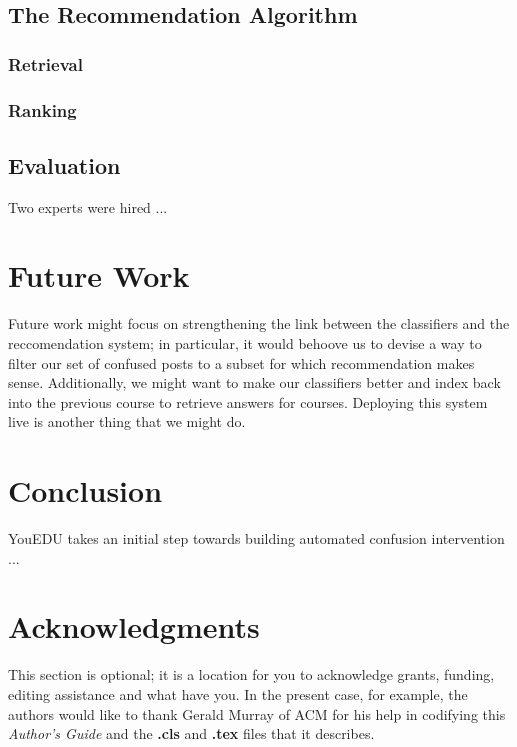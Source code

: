 \documentclass{edm_template}
\begin{document}
\subsection{The Recommendation Algorithm}
\subsubsection{Retrieval}
\subsubsection{Ranking}

\subsection{Evaluation}
Two experts were hired ...

\section{Future Work}
Future work might focus on strengthening the link between the classifiers and the reccomendation system; in particular, it would behoove us to devise a way to filter our set of confused posts to a subset for which recommendation makes sense. Additionally, we might want to make our classifiers better and index back into the previous course to retrieve answers for courses. Deploying this system live is another thing that we might do. 

\section{Conclusion}
YouEDU takes an initial step towards building automated confusion intervention ... 


\section{Acknowledgments}
This section is optional\cite{wen2014sentiment}; it is a location for you
to acknowledge grants, funding, editing assistance and
what have you.  In the present case, for example, the
authors would like to thank Gerald Murray of ACM for
his help in codifying this \textit{Author's Guide}
and the \textbf{.cls} and \textbf{.tex} files that it describes.

%

%
%
\balancecolumns
\end{document}
